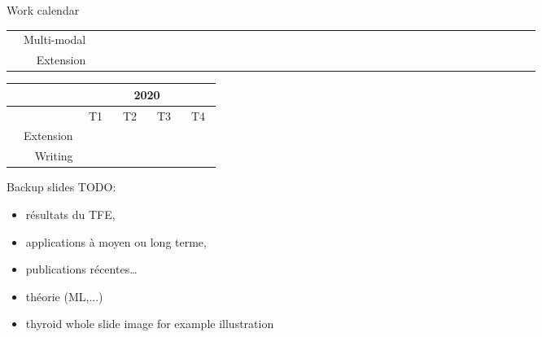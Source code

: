 \documentclass{beamer}
\begin{document}
\begin{frame}{Work calendar}
\begin{table}
\begin{tabular}{|c|r|ccc|cccccccccccc|cccccccccccc|cccccccccccc|}
		& Multi-modal & & & & & & & & & & & & & & & & & & & & & & & & & & & & & & \cellcolor{black} & \cellcolor{black} & \cellcolor{black} & \cellcolor{black} & \cellcolor{black} & \cellcolor{black} & & & & \\
		\hdashline
		& Extension 
		& & & & & & & & & & & & & & & & & & & & & & & & & & & & & & & & & & & & \cellcolor{black} & \cellcolor{black} & \cellcolor{black} & \cellcolor{black} \\
		\hline 
	\end{tabular}


\vfill

	\begin{tabular}{|c|r|cccccccccccc|}
		\hline
		& & \multicolumn{12}{c|}{2020}  \\
		\hline	
		& & \multicolumn{3}{c|}{T1} & \multicolumn{3}{c|}{T2} & \multicolumn{3}{c|}{T3} & \multicolumn{3}{c|}{T4} \\ 
		\hline
		& Extension & \cellcolor{black} & \cellcolor{black} & & & & & & & & &  & \\
		& Writing & & & \cellcolor{black} & \cellcolor{black} & \cellcolor{black} & \cellcolor{black} & \cellcolor{black} & \cellcolor{black} & & & & \\
		\hline 
	\end{tabular}


	\end{table}
\end{frame}

\begin{frame}{Backup slides}
TODO: \\
\begin{itemize}
	\item résultats du TFE, 
	\item applications à moyen ou long terme, 
	\item publications récentes…
	\item théorie (ML,...)
	\item thyroid whole slide image for example illustration
\end{itemize}
\end{frame}
\end{document}
